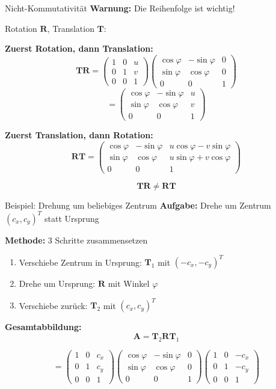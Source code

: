 \documentclass[a4paper, fontsize=7pt]{scrartcl}
\begin{document}
\begin{subbox}{Nicht-Kommutativität}
\textbf{Warnung:} Die Reihenfolge ist wichtig!

Rotation $\mathbf{R}$, Translation $\mathbf{T}$:

\textbf{Zuerst Rotation, dann Translation:}
\[\mathbf{TR} = \begin{pmatrix} 1 & 0 & u \\ 0 & 1 & v \\ 0 & 0 & 1 \end{pmatrix} \begin{pmatrix} \cos\varphi & -\sin\varphi & 0 \\ \sin\varphi & \cos\varphi & 0 \\ 0 & 0 & 1 \end{pmatrix} \]
\[= \begin{pmatrix} \cos\varphi & -\sin\varphi & u \\ \sin\varphi & \cos\varphi & v \\ 0 & 0 & 1 \end{pmatrix}\]

\textbf{Zuerst Translation, dann Rotation:}
\[\mathbf{RT} = \begin{pmatrix} \cos\varphi & -\sin\varphi & u\cos\varphi - v\sin\varphi \\ \sin\varphi & \cos\varphi & u\sin\varphi + v\cos\varphi \\ 0 & 0 & 1 \end{pmatrix}\]

\[\mathbf{TR} \neq \mathbf{RT}\]
\end{subbox}

\begin{subbox}{Beispiel: Drehung um beliebiges Zentrum}
\textbf{Aufgabe:} Drehe um Zentrum $(c_x, c_y)^T$ statt Ursprung

\textbf{Methode:} 3 Schritte zusammensetzen
\begin{enumerate}
    \item Verschiebe Zentrum in Ursprung: $\mathbf{T}_1$ mit $(-c_x, -c_y)^T$
    \item Drehe um Ursprung: $\mathbf{R}$ mit Winkel $\varphi$
    \item Verschiebe zurück: $\mathbf{T}_2$ mit $(c_x, c_y)^T$
\end{enumerate}

\textbf{Gesamtabbildung:}
$$\mathbf{A} = \mathbf{T}_2 \mathbf{R} \mathbf{T}_1$$

$$= \begin{pmatrix} 1 & 0 & c_x \\ 0 & 1 & c_y \\ 0 & 0 & 1 \end{pmatrix} \begin{pmatrix} \cos\varphi & -\sin\varphi & 0 \\ \sin\varphi & \cos\varphi & 0 \\ 0 & 0 & 1 \end{pmatrix} \begin{pmatrix} 1 & 0 & -c_x \\ 0 & 1 & -c_y \\ 0 & 0 & 1 \end{pmatrix}$$
\end{subbox}
\end{document}
